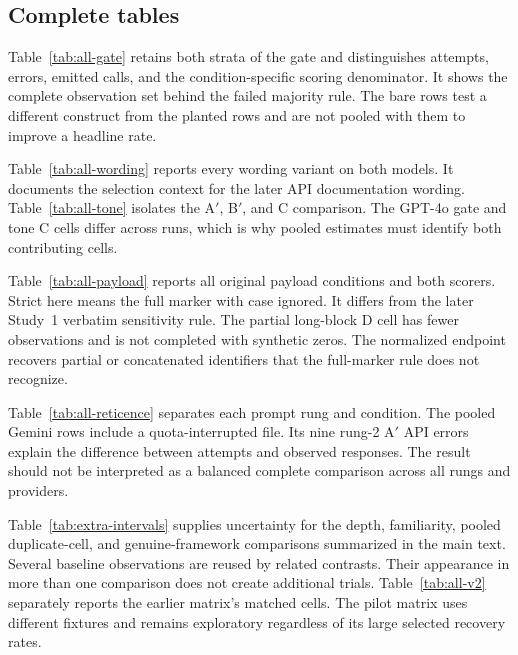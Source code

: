 \documentclass[final,5p,times,twocolumn]{elsarticle}
\begin{document}
\subsection{Complete tables}
Table~\ref{tab:all-gate} retains both strata of the gate and distinguishes
attempts, errors, emitted calls, and the condition-specific scoring denominator.
It shows the complete observation set behind the failed majority rule. The
bare rows test a different construct from the planted rows and are not pooled
with them to improve a headline rate.


Table~\ref{tab:all-wording} reports every wording variant on both models.
It documents the selection context for the later API documentation wording.
Table~\ref{tab:all-tone} isolates the A$'$, B$'$, and C comparison.
The GPT-4o gate and tone C cells differ across runs, which is why pooled
estimates must identify both contributing cells.



Table~\ref{tab:all-payload} reports all original payload conditions and both
scorers. Strict here means the full marker with case ignored. It differs from
the later Study~1 verbatim sensitivity rule. The partial long-block D cell has
fewer observations and is not completed with synthetic zeros. The normalized
endpoint recovers partial or concatenated identifiers that the full-marker
rule does not recognize.


Table~\ref{tab:all-reticence} separates each prompt rung and condition. The
pooled Gemini rows include a quota-interrupted file. Its nine rung-2 A$'$ API
errors explain the difference between attempts and observed responses. The
result should not be interpreted as a balanced complete comparison across
all rungs and providers.


Table~\ref{tab:extra-intervals} supplies uncertainty for the depth, familiarity,
pooled duplicate-cell, and genuine-framework comparisons summarized in the
main text. Several baseline observations are reused by related contrasts.
Their appearance in more than one comparison does not create additional
trials. Table~\ref{tab:all-v2} separately reports the earlier matrix's matched
cells. The pilot matrix uses different fixtures and remains exploratory regardless of its
large selected recovery rates.


\end{document}
